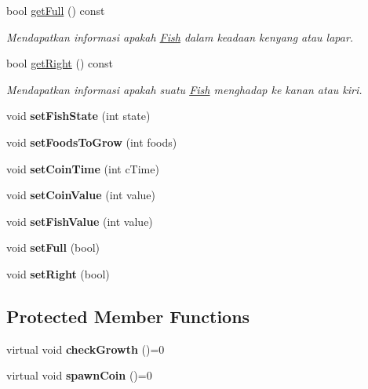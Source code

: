 \begin{DoxyCompactItemize}
bool \hyperlink{classFish_afab92c9739af9d442b9e1623fb56a8d1}{get\+Full} () const
\begin{DoxyCompactList}\small\item\em Mendapatkan informasi apakah \hyperlink{classFish}{Fish} dalam keadaan kenyang atau lapar. \end{DoxyCompactList}\item 
\mbox{\label{classFish_aa2dfabcc7a6845d0bec12e77d234a269}} 
bool \hyperlink{classFish_aa2dfabcc7a6845d0bec12e77d234a269}{get\+Right} () const
\begin{DoxyCompactList}\small\item\em Mendapatkan informasi apakah suatu \hyperlink{classFish}{Fish} menghadap ke kanan atau kiri. \end{DoxyCompactList}\item 
\mbox{\label{classFish_a53f7a677495bf56d80d9d5aa00505e98}} 
void {\bfseries set\+Fish\+State} (int state)
\item 
\mbox{\label{classFish_ac3f82829278b62ecc56fc68240b9a3f2}} 
void {\bfseries set\+Foods\+To\+Grow} (int foods)
\item 
\mbox{\label{classFish_a4283e7b3d67908fbf3c178a987159cb2}} 
void {\bfseries set\+Coin\+Time} (int c\+Time)
\item 
\mbox{\label{classFish_ab61f43526d46c7edeee730be29c1eba0}} 
void {\bfseries set\+Coin\+Value} (int value)
\item 
\mbox{\label{classFish_af8633a8e349a04e3e1b4ee39e119b1e7}} 
void {\bfseries set\+Fish\+Value} (int value)
\item 
\mbox{\label{classFish_aeb2dc6cb0b3e0b57a8e458824fdd1d5d}} 
void {\bfseries set\+Full} (bool)
\item 
\mbox{\label{classFish_ad20d93cc7fdc5f560a06d120263feff6}} 
void {\bfseries set\+Right} (bool)
\end{DoxyCompactItemize}
\subsection*{Protected Member Functions}
\begin{DoxyCompactItemize}
\item 
\mbox{\label{classFish_a45d7032d8c2eacedabb8a28799399adb}} 
virtual void {\bfseries check\+Growth} ()=0
\item 
\mbox{\label{classFish_acd7cbe8b09a544ca22e92a8edde1bacd}} 
virtual void {\bfseries spawn\+Coin} ()=0
\end{DoxyCompactItemize}
